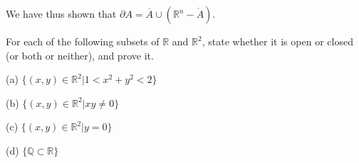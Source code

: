 \begin{solution}
    We have thus shown that $\partial{A} = \overline{A} \cup (\mathbb{R}^n - \mathring{A})$.
\end{solution}

\begin{exercise}{5}
    For each of the following subsets of $\mathbb{R}$ and $\mathbb{R}^2$, state whether it is open or closed (or both or neither), and prove it.

    (a) $\{(x, y) \in \mathbb{R}^2 \lvert 1 < x^2+y^2 < 2\}$

    (b) $\{(x, y) \in \mathbb{R}^2 \lvert xy \neq 0\}$

    (c) $\{(x, y) \in \mathbb{R}^2 \lvert y = 0 \}$

    (d) $\{\mathbb{Q} \subset \mathbb{R}\}$
\end{exercise}

